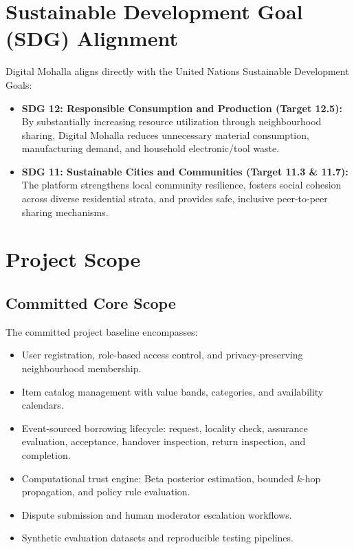 \section{Sustainable Development Goal (SDG) Alignment}
Digital Mohalla aligns directly with the United Nations Sustainable Development Goals:
\begin{itemize}
    \item \textbf{SDG 12: Responsible Consumption and Production (Target 12.5):} By substantially increasing resource utilization through neighbourhood sharing, Digital Mohalla reduces unnecessary material consumption, manufacturing demand, and household electronic/tool waste.
    \item \textbf{SDG 11: Sustainable Cities and Communities (Target 11.3 \& 11.7):} The platform strengthens local community resilience, fosters social cohesion across diverse residential strata, and provides safe, inclusive peer-to-peer sharing mechanisms.
\end{itemize}

\section{Project Scope}

\subsection{Committed Core Scope}
The committed project baseline encompasses:
\begin{itemize}
    \item User registration, role-based access control, and privacy-preserving neighbourhood membership.
    \item Item catalog management with value bands, categories, and availability calendars.
    \item Event-sourced borrowing lifecycle: request, locality check, assurance evaluation, acceptance, handover inspection, return inspection, and completion.
    \item Computational trust engine: Beta posterior estimation, bounded $k$-hop propagation, and policy rule evaluation.
    \item Dispute submission and human moderator escalation workflows.
    \item Synthetic evaluation datasets and reproducible testing pipelines.
\end{itemize}

